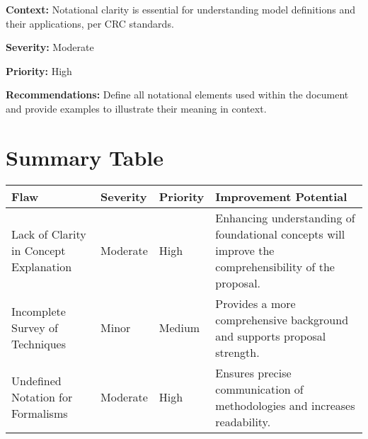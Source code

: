 \documentclass{article}
\begin{document}
\textbf{Context:} Notational clarity is essential for understanding model definitions and their applications, per CRC standards.

\textbf{Severity:} Moderate

\textbf{Priority:} High

\textbf{Recommendations:} Define all notational elements used within the document and provide examples to illustrate their meaning in context.

\section*{Summary Table}

\begin{longtable}{|p{4cm}|p{3cm}|p{3cm}|p{5cm}|}
\hline
\textbf{Flaw} & \textbf{Severity} & \textbf{Priority} & \textbf{Improvement Potential} \\
\hline
Lack of Clarity in Concept Explanation & Moderate & High & Enhancing understanding of foundational concepts will improve the comprehensibility of the proposal. \\
\hline
Incomplete Survey of Techniques & Minor & Medium & Provides a more comprehensive background and supports proposal strength. \\
\hline
Undefined Notation for Formalisms & Moderate & High & Ensures precise communication of methodologies and increases readability. \\
\hline
\end{longtable}
\end{document}
